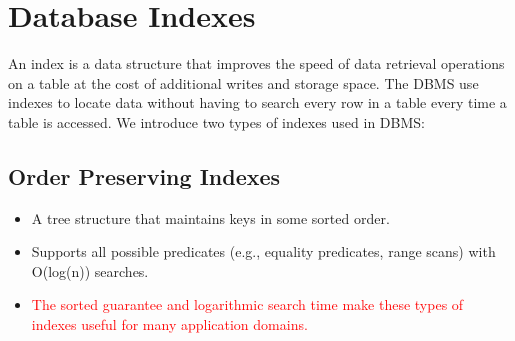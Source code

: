\documentclass[11pt]{article}
\newcommand{\rr}[1]{\textcolor{red}{#1}}
\begin{document}
\maketitle
\thispagestyle{plain}

\section{Database Indexes}
An index is a data structure that improves the speed of data retrieval operations on a table at the 
cost of additional writes and storage space.
The DBMS use indexes to locate data without having to search every row in a table 
every time a table is accessed. We introduce two types of indexes used in DBMS:

\subsection*{Order Preserving Indexes}
\begin{itemize}
    \item
    A tree structure that maintains keys in some sorted order.
    
    \item
    Supports all possible predicates (e.g., equality predicates, range scans) with O(log(n)) searches.
    
    \item
    \rr{The sorted guarantee and logarithmic search time make these types of indexes useful for many application domains.}
\end{itemize}

\end{document}
